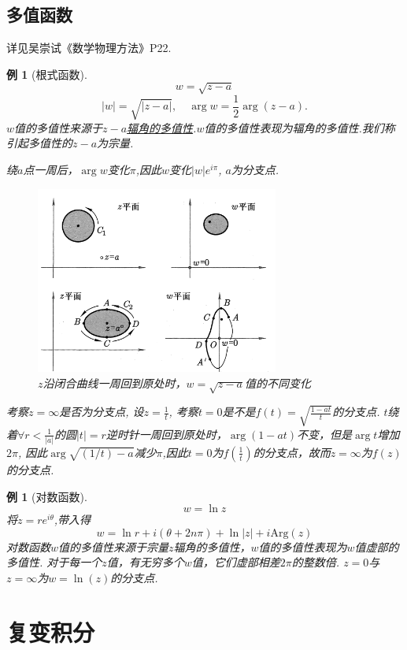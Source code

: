 \documentclass[11pt, a4paper, twoside]{ctexbook}
\newtheorem{example}[theorem]{例}
\begin{document}
\section{多值函数}
详见吴崇试《数学物理方法》P22.
\begin{example}[根式函数]
    $$w = \sqrt{z-a}$$ 
    $$|w|=\sqrt{|z-a|},\quad\arg w=\frac{1}{2}\arg(z-a).$$
    $w$值的多值性来源于\underline{$z-a$辐角的多值性}.$w$值的多值性表现为辐角的多值性.我们称引起多值性的$z-a$为宗量.
    
    绕$a$点一周后，$\arg w$变化$\pi$,因此$w$变化$|w|e^{i\pi}$, $a$为分支点.
    \begin{figure}[htbp]
        \centering
        \includegraphics[width = 8cm]{多值函数.png}
        \caption{$z$沿闭合曲线一周回到原处时，$w= \sqrt{z-a}$值的不同变化}
    \end{figure}
    考察$z = \infty$是否为分支点, 设$z = \frac{1}{t}$, 考察$t = 0$是不是$f(t) = \sqrt{\frac{1-at}{t}}$的分支点.
    $t$绕着$\forall r < \frac{1}{|a|}$的圆$|t| = r$逆时针一周回到原处时，$\arg(1-at)$不变，但是$\arg t$增加$2\pi$,
    因此$\arg\sqrt{(1/t)- a}$减少$\pi$,因此$t = 0$为$f(\frac{1}{t})$的分支点，故而$z = \infty$为$f(z)$的分支点.
\end{example}
\begin{example}[对数函数]
    $$w = \ln z$$
    将$z = re^{i\theta}$,带入得$$w = \ln  r+ i(\theta + 2n\pi) + \ln|z| + i \mathrm{Arg}(z)$$
    对数函数$w$值的多值性来源于宗量$z$辐角的多值性，$w$值的多值性表现为$w$值虚部的多值性.
    对于每一个$z$值，有无穷多个$w$值，它们虚部相差$2\pi$的整数倍.
    $z = 0$与$z = \infty$为$w = \ln(z)$的分支点.
\end{example}
\renewcommand{\cleardoublepage}{}
\renewcommand{\clearpage}{}
\chapter{复变积分}
\end{document}
